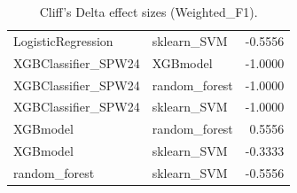 \begin{table}[t]
\begin{tabular}{llr}
LogisticRegression & sklearn_SVM & -0.5556 \\
XGBClassifier_SPW24 & XGBmodel & -1.0000 \\
XGBClassifier_SPW24 & random_forest & -1.0000 \\
XGBClassifier_SPW24 & sklearn_SVM & -1.0000 \\
XGBmodel & random_forest & 0.5556 \\
XGBmodel & sklearn_SVM & -0.3333 \\
random_forest & sklearn_SVM & -0.5556 \\
\bottomrule
\end{tabular}
\caption{Cliff's Delta effect sizes (Weighted_F1).}
\label{tab:cliffs_Weighted_F1}
\end{table}